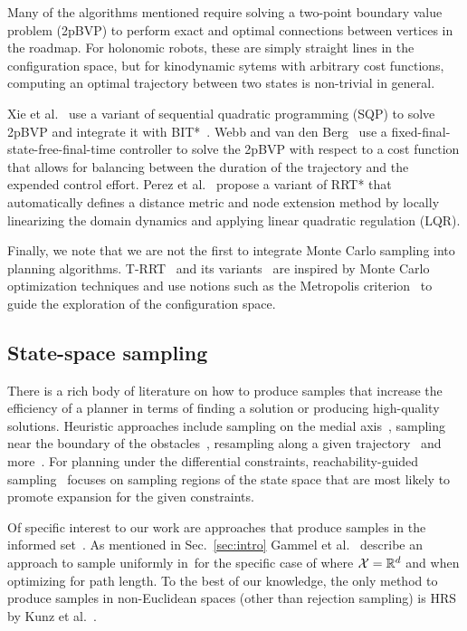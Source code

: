 \documentclass[letterpaper, 10 pt, conference]{ieeeconf}  %
\begin{document}
Many of the algorithms mentioned require solving a two-point boundary value problem (2pBVP) to perform exact and optimal connections between vertices in the roadmap.
For holonomic robots, these are simply straight lines in the configuration space, but for kinodynamic sytems with arbitrary cost functions,  computing an optimal trajectory between two states is non-trivial in general.

Xie et al.~\cite{XBPA15} use a variant of sequential quadratic programming (SQP) to solve 2pBVP and integrate it with BIT*~\cite{GSB15}.
Webb and van den Berg~\cite{WB13} use a fixed-final-state-free-final-time controller to solve the 2pBVP  with respect to a cost function that allows for balancing between the duration of the trajectory and the expended control effort.
Perez et al.~\cite{PPKKL12} propose a variant of RRT* that automatically defines a distance metric and node extension method by locally linearizing
the domain dynamics and applying linear quadratic regulation (LQR).

Finally, we note that we are not the first to integrate Monte Carlo sampling into planning algorithms. T-RRT~\cite{JCS10} and its variants~\cite{DSC13} are inspired by Monte Carlo optimization techniques and use notions such as the Metropolis criterion~\cite{CG95} to guide the exploration of the configuration space.


\subsection{State-space sampling}
\label{subsec:sampling}
There is a rich body of literature on how to produce samples that increase the efficiency of a planner in terms of finding a solution or producing high-quality solutions.
Heuristic approaches include
sampling on the medial axis~\cite{WAS99a, WAS99b, LTA03, YDLTA14},
sampling near the boundary of the obstacles~\cite{ABDJV98, YTEA12},
resampling along a given trajectory~\cite{APD11, AS11}
and more~\cite{US03, SWT09}.
For planning under the differential constraints,
reachability-guided sampling~\cite{SWT09, PLAEFRA17} focuses on sampling regions of the state space that are most likely to promote expansion for the given constraints.


Of specific interest to our work are approaches that produce samples in the informed set~\Cinf.
As mentioned in Sec.~\ref{sec:intro} Gammel et al.~\cite{GSB14} describe an approach to sample uniformly in~\Cinf for the specific case of where $\mathcal{X} = \mathbb{R}^d$ and when optimizing for path length.
To the best of our knowledge, the only method to produce samples in non-Euclidean spaces (other than rejection sampling) is HRS by Kunz et al.~\cite{KTC16}.
\end{document}

